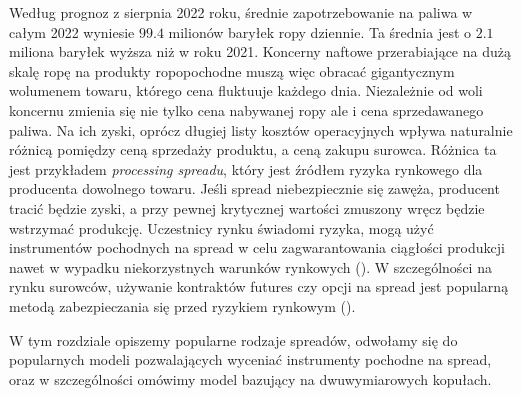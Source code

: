 Według prognoz \cite{PetroleumForecasts} z sierpnia 2022 roku, średnie zapotrzebowanie na paliwa w całym 2022 wyniesie $99.4$ milionów baryłek ropy dziennie. Ta średnia jest o $2.1$ miliona baryłek wyższa niż w roku 2021. Koncerny naftowe przerabiające na dużą skalę ropę na produkty ropopochodne muszą więc obracać gigantycznym wolumenem towaru, którego cena fluktuuje każdego dnia.
Niezależnie od woli koncernu zmienia się nie tylko cena nabywanej ropy ale i cena sprzedawanego paliwa. Na ich zyski, oprócz długiej listy kosztów operacyjnych wpływa naturalnie różnicą pomiędzy ceną sprzedaży produktu, a ceną zakupu surowca. Różnica ta jest przykładem \emph{processing spreadu}, który jest źródłem ryzyka rynkowego dla producenta dowolnego towaru. Jeśli spread niebezpiecznie się zawęża, producent tracić będzie zyski, a przy pewnej krytycznej wartości zmuszony wręcz będzie wstrzymać produkcję. Uczestnicy rynku świadomi ryzyka, mogą użyć instrumentów pochodnych na spread w celu zagwarantowania ciągłości produkcji nawet w wypadku niekorzystnych warunków rynkowych (\cite{KGHM}). W szczególności na rynku surowców, używanie kontraktów futures czy opcji na spread jest popularną metodą zabezpieczania się przed ryzykiem rynkowym (\cite{spread_hedging}).

W tym rozdziale opiszemy popularne rodzaje spreadów, odwołamy się do popularnych modeli pozwalających wyceniać instrumenty pochodne na spread, oraz w szczególności omówimy model bazujący na dwuwymiarowych kopułach.